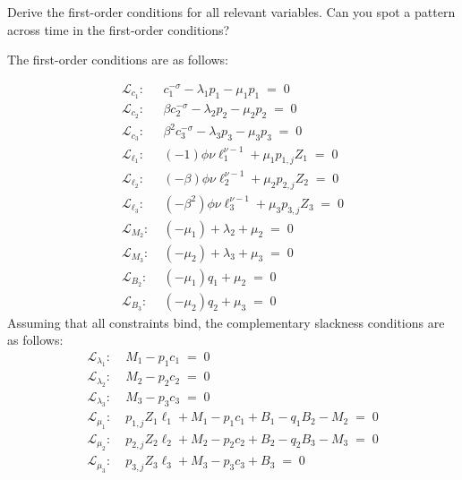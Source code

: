 \documentclass[a4paper, 12pt]{article}
\begin{document}
\newpage%
\begin{Exercise}[title={First-order conditions},label=ex_1]%
	Derive the first-order conditions for all relevant variables. Can you spot a pattern across time in the first-order conditions?%
\end{Exercise}%
\bigskip%
\begin{Answer}%
	The first-order conditions are as follows:%
	\begin{small}%
	\begin{align}%
		\mathcal{L}_{c_1}: & \; c_1^{-\sigma} - \lambda_1 p_1 - \mu_1 p_1 \; = \; 0\\%
		\mathcal{L}_{c_2}: & \; \beta c_2^{-\sigma} - \lambda_2 p_2 - \mu_2 p_2 \; = \; 0\\%
		\mathcal{L}_{c_3}: & \; \beta^2 c_3^{-\sigma} - \lambda_3 p_3 - \mu_3 p_3 \; = \; 0\\%
		\mathcal{L}_{\ell_1}: & \; (-1) \phi \nu \ell_1^{\nu-1} + \mu_1 p_{1,j} Z_1 \; = \; 0\\%
		\mathcal{L}_{\ell_2}: & \;(-\beta) \phi \nu \ell_2^{\nu-1} + \mu_2 p_{2,j} Z_2 \; = \; 0\\%
		\mathcal{L}_{\ell_3}: & \; (-\beta^2) \phi \nu \ell_3^{\nu-1} + \mu_3 p_{3,j} Z_3 \; = \; 0\\%
		\mathcal{L}_{M_2}: & \; (-\mu_1) + \lambda_2 + \mu_2 \; = \; 0\\%
		\mathcal{L}_{M_3}: & \; (-\mu_2) + \lambda_3 + \mu_3 \; = \; 0\\%
		\mathcal{L}_{B_2}: & \; (-\mu_1) q_1 + \mu_2 \; = \; 0\\%
		\mathcal{L}_{B_3}: & \; (-\mu_2) q_2 + \mu_3 \; = \; 0%
	\end{align}%
	Assuming that all constraints bind, the complementary slackness conditions are as follows:%
	\begin{align}%
		\mathcal{L}_{\lambda_1}: & \; M_1 - p_1 c_1 \; = \; 0\\%
		\mathcal{L}_{\lambda_2}: & \; M_2 - p_2 c_2 \; = \; 0\\%
		\mathcal{L}_{\lambda_3}: & \; M_3 - p_3 c_3 \; = \; 0\\%
		\mathcal{L}_{\mu_1}: & \; p_{1,j} Z_1 \ell_1 + M_1 - p_1 c_1 + B_1 -q_1 B_2 - M_2 \; = \; 0\\%
		\mathcal{L}_{\mu_2}: & \; p_{2,j} Z_2 \ell_2 + M_2 - p_2 c_2 + B_2 -q_2 B_3 - M_3 \; = \; 0\\%
		\mathcal{L}_{\mu_3}: & \; p_{3,j} Z_3 \ell_3 + M_3 -p_3 c_3 +B_3 \; = \; 0%

\end{align}
\end{small}
\end{Answer}
\end{document}
